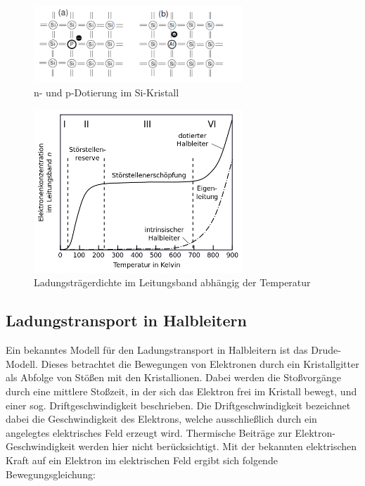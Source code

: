 \begin{figure}[htbp]  
     \includegraphics[width=0.7\textwidth]{Dotierung.png}
  \caption{n- und p-Dotierung im Si-Kristall \cite{Hofmann}}
  \label{Dotierung}
\end{figure}

\begin{figure}[htbp]  
     \includegraphics[width=0.7\textwidth]{Leitung.png}
  \caption{Ladungsträgerdichte im Leitungsband abhängig der Temperatur \cite{Leitung}}
  \label{Leitung}
\end{figure}

\subsection{Ladungstransport in Halbleitern}

Ein bekanntes Modell für den Ladungstransport in Halbleitern ist das Drude-Modell. Dieses betrachtet die Bewegungen von Elektronen durch ein Kristallgitter als Abfolge von Stößen mit den Kristallionen. Dabei werden die Stoßvorgänge durch eine mittlere Stoßzeit, in der sich das Elektron frei im Kristall bewegt, und einer sog. Driftgeschwindigkeit beschrieben. Die Driftgeschwindigkeit bezeichnet dabei die Geschwindigkeit des Elektrons, welche ausschließlich durch ein angelegtes elektrisches Feld erzeugt wird. Thermische Beiträge zur Elektron-Geschwindigkeit werden hier nicht berücksichtigt. Mit der bekannten elektrischen Kraft auf ein Elektron im elektrischen Feld ergibt sich folgende 
Bewegungsgleichung:

